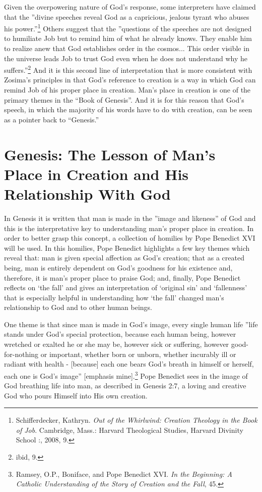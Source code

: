 Given the overpowering nature of God's response, some interpreters have claimed that the ''divine speeches reveal God as a capricious, jealous tyrant who abuses his power.''\footnote{Schifferdecker, Kathryn. \emph{Out of the Whirlwind: Creation Theology in the Book of Job}. Cambridge, Mass.: Harvard Theological Studies, Harvard Divinity School :, 2008, 9.} Others suggest that the ''questions of the speeches are not designed to humiliate Job but to remind him of what he already knows. They enable him to realize anew that God establishes order in the cosmos... This order visible in the universe leads Job to trust God even when he does not understand why he suffers.''\footnote{ibid, 9.} And it is this second line of interpretation that is more consistent with Zosima's principles in that God's reference to creation is a way in which God can remind Job of his proper place in creation. Man's place in creation is one of the primary themes in the ``Book of Genesis''. And it is for this reason that God's speech, in which the majority of his words have to do with creation, can be seen as a pointer back to ``Genesis.''

\section{Genesis: The Lesson of Man's Place in Creation and His Relationship With God}
In Genesis it is written that man is made in the ''image and likeness'' of God and this is the interpretative key to understanding man's proper place in creation. In order to better grasp this concept, a collection of homilies by Pope Benedict XVI will be used. In this homilies, Pope Benedict highlights a few key themes which reveal that: man is given special affection as God's creation; that as a created being, man is entirely dependent on God's goodness for his existence and, therefore, it is man's proper place to praise God; and, finally, Pope Benedict reflects on `the fall' and gives an interpretation of `original sin' and `fallenness' that is especially helpful in understanding how `the fall' changed man's relationship to God and to other human beings. 

One theme is that since man is made in God's image, every single human life ''life stands under God's special protection, because each human being, however wretched or exalted he or she may be, however sick or suffering, however good-for-nothing or important, whether born or unborn, whether incurably ill or radiant with health - [because] each one bears God's breath in himself or herself, each one is God's image'' [emphasis mine].\footnote{Ramsey, O.P., Boniface, and Pope Benedict XVI. \emph{In the Beginning: A Catholic Understanding of the Story of Creation and the Fall}, 45.} Pope Benedict sees in the image of God breathing life into man, as described in Genesis 2:7, a loving and creative God who pours Himself into His own creation. 


